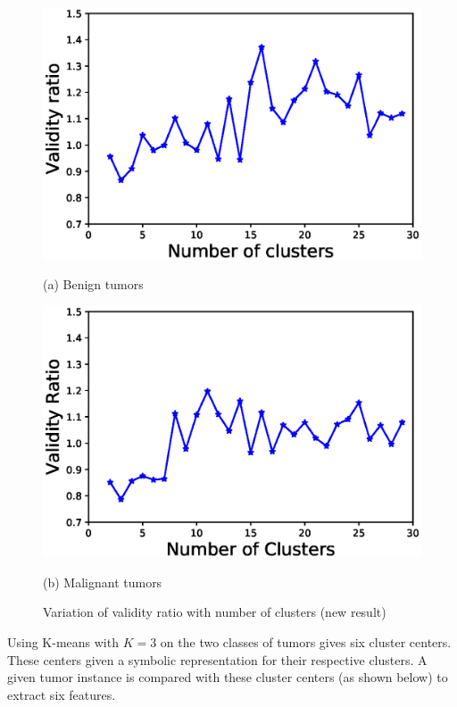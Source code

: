 \documentclass[twoside]{iitbreport}
\begin{document}
\begin{figure}[H]
\begin{minipage}[t]{0.5\linewidth}
    \includegraphics[scale=0.52]{Figures/Benign_VR_K_New.eps}
    \caption*{(a) Benign tumors}
\end{minipage}%
\begin{minipage}[t]{0.5\linewidth}
    \includegraphics[scale=0.52]{Figures/Malignant_VR_K_New.eps}
    \caption*{(b) Malignant tumors}
\end{minipage} 
\caption{Variation of validity ratio with number of clusters (new result)}
 \label{NewVariation}
\end{figure}

Using K-means with $K=3$ on the two classes of tumors gives six cluster centers. These centers given a symbolic representation  for their respective clusters. A given tumor instance is compared with these cluster centers (as shown below) to extract six features.
\end{document}
